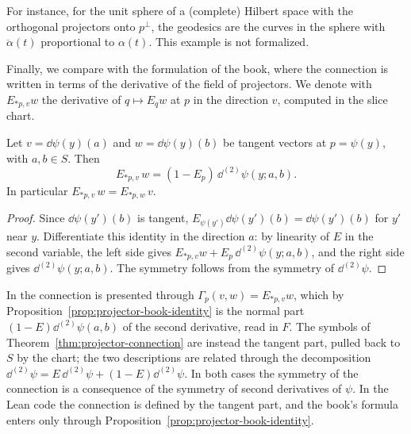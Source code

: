 For instance, for the unit sphere of a (complete) Hilbert space with the orthogonal projectors
onto $p^\perp$, the geodesics are the curves in the sphere with $\ddot\alpha(t)$ proportional to
$\alpha(t)$. This example is not formalized.

Finally, we compare with the formulation of the book, where the connection is written in terms of
the derivative of the field of projectors. We denote with $E_{*p, v} w$ the derivative of
$q \mapsto E_q w$ at $p$ in the direction $v$, computed in the slice chart.

\begin{proposition}
  \label{prop:projector-book-identity}
  \leanok
  Let $v = \dd\psi(y)(a)$ and $w = \dd\psi(y)(b)$ be tangent vectors at $p = \psi(y)$, with
  $a, b \in S$. Then
  \[
    E_{*p, v}\, w = (1 - E_p)\, \dd^{(2)}\psi(y; a, b).
  \]
  In particular $E_{*p, v}\, w = E_{*p, w}\, v$.
\end{proposition}

\begin{proof}
  \leanok
  Since $\dd\psi(y')(b)$ is tangent, $E_{\psi(y')}\dd\psi(y')(b) = \dd\psi(y')(b)$ for $y'$ near
  $y$. Differentiate this identity in the direction $a$: by linearity of $E$ in the second
  variable, the left side gives $E_{*p, v} w + E_p\, \dd^{(2)}\psi(y; a, b)$, and the right side
  gives $\dd^{(2)}\psi(y; a, b)$. The symmetry follows from the symmetry of $\dd^{(2)}\psi$.
\end{proof}

\begin{remark}
  In \cite{Lar26} the connection is presented through $\Gamma_p(v, w) = E_{*p, v} w$, which by
  Proposition~\ref{prop:projector-book-identity} is the normal part $(1 - E)\dd^{(2)}\psi(a, b)$
  of the second derivative, read in $F$. The symbols of
  Theorem~\ref{thm:projector-connection} are instead the tangent part, pulled back to $S$ by the
  chart; the two descriptions are related through the decomposition
  $\dd^{(2)}\psi = E\,\dd^{(2)}\psi + (1 - E)\dd^{(2)}\psi$. In both cases the symmetry of the
  connection is a consequence of the symmetry of second derivatives of $\psi$. In the Lean code
  the connection is defined by the tangent part, and the book's formula enters only through
  Proposition~\ref{prop:projector-book-identity}.
\end{remark}
